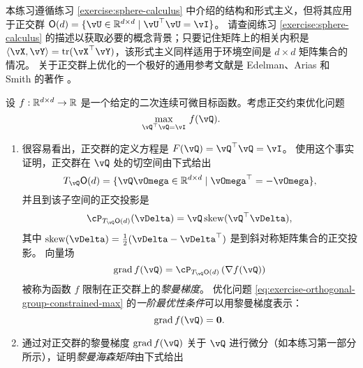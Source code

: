 \documentclass[../../book-main.tex]{subfiles}
\begin{document}
\begin{exercise}\label{exercise:orthogonal-group-calculus}
    本练习遵循练习 \ref{exercise:sphere-calculus} 中介绍的结构和形式主义，但将其应用于正交群 $\O(d) = \set{\vU \in \R^{d \times d} \given \vU^\top \vU = \vI}$。
    请查阅练习 \ref{exercise:sphere-calculus} 的描述以获取必要的概念背景；只要记住矩阵上的相关内积是 $\ip{\vX}{\vY} = \tr(\vX^\top \vY)$，该形式主义同样适用于环境空间是 $d \times d$ 矩阵集合的情况。
    关于正交群上优化的一个极好的通用参考文献是 Edelman、Arias 和 Smith 的著作 \cite{Edelman1998-lg}。
    
    设 $f : \mathbb{R}^{d\times d} \to \mathbb{R}$ 是一个给定的二次连续可微目标函数。考虑正交约束优化问题
    \begin{equation}\label{eq:exercise-orthogonal-group-constrained-max}
        \max_{\vQ^\top \vQ = \vI}\, f(\vQ). 
    \end{equation}
    \begin{enumerate}
        \item 很容易看出，正交群的定义方程是 $F(\vQ) = \vQ^\top \vQ = \vI$。
        使用这个事实证明，正交群在 $\vQ$ 处的切空间由下式给出
        \begin{equation*}
            T_{\vQ} \O(d) = \set{\vQ \vOmega \in \R^{d\times d} \given \vOmega^\top = - \vOmega},
        \end{equation*}
        并且到该子空间的正交投影是
        \begin{equation*}
        \cP_{T_{\vQ}\O(d)}(\vDelta) =  \vQ \Skew(\vQ^\top \vDelta),
        \end{equation*}
        其中 $\Skew(\vDelta) = \tfrac{1}{2} ( \vDelta - \vDelta^\top)$ 是到斜对称矩阵集合的正交投影。
        向量场
        \begin{equation}\label{eq:exercise-riemann-grad-orthogonal-group}
        \mathrm{grad}\, f(\vQ) = \cP_{T_{\vQ} \O(d)} \left( \nabla f(\vQ) \right)
        \end{equation}
        被称为函数 $f$ 限制在正交群上的\textit{黎曼梯度}。
        优化问题 \eqref{eq:exercise-orthogonal-group-constrained-max} 的\textit{一阶最优性条件}可以用黎曼梯度表示：
        \begin{equation*}
            \mathrm{grad}\, f(\vQ) = \mathbf{0}.
        \end{equation*}
        \item 通过对正交群的黎曼梯度 $\mathrm{grad}\, f(\vQ)$ 关于 $\vQ$ 进行微分（如本练习第一部分所示），证明\textit{黎曼海森矩阵}由下式给出
        \begin{equation}\label{eq:exercise-riemann-hess-orthogonal-group}

\end{equation}
\end{enumerate}
\end{exercise}
\end{document}
